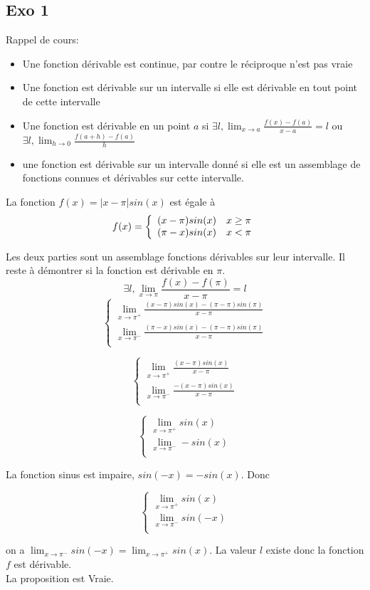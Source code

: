 \documentclass[]{book}
\theoremstyle{definition}
\begin{document}
\subsection*{Exo 1}
Rappel de cours:
\begin{itemize}
\item Une fonction d\'erivable est continue, par contre le r\'eciproque n'est pas vraie
\item Une fonction est d\'erivable sur un intervalle si elle est d\'erivable en tout point de cette intervalle
\item Une fonction est d\'erivable en un point $a$ si $\exists l, \lim_{x \to a}\frac{f(x)-f(a)}{x-a} = l$ ou $\exists l, \lim_{h \to 0}\frac{f(a+h)-f(a)}{h}$
\item une fonction est d\'erivable sur un intervalle donné si elle est un assemblage de fonctions connues et dérivables sur cette intervalle.
\end{itemize}

La fonction $f(x) = |x-\pi| sin(x)$ est \'egale \`a
$$f(x) = 
\left\{ 
\begin{array}{l l}
 (x-\pi) sin(x) & x \ge \pi \\
 (\pi-x) sin(x) & x < \pi \\
\end{array}
\right. 
$$

Les deux parties sont un assemblage fonctions d\'erivables sur leur intervalle. Il reste \`a d\'emontrer si la fonction est d\'erivable en $\pi$.
$$\exists l, \lim_{x \to \pi}\frac{f(x)-f(\pi)}{x-\pi} = l$$
$$ 
\left\{ 
\begin{array}{l}
 \lim_{x \to \pi^{+}}\frac{(x-\pi) sin(x) - (\pi-\pi) sin(\pi)}{x-\pi} \\
 \lim_{x \to \pi^{-}}\frac{(\pi-x) sin(x) - (\pi-\pi) sin(\pi)}{x-\pi} \\
\end{array}
\right. 
$$

$$ 
\left\{ 
\begin{array}{l}
 \lim_{x \to \pi^{+}}\frac{(x-\pi) sin(x)}{x-\pi} \\
 \lim_{x \to \pi^{-}}\frac{-(x-\pi) sin(x)}{x-\pi} \\
\end{array}
\right. 
$$

$$ 
\left\{ 
\begin{array}{l}
 \lim_{x \to \pi^{+}} sin(x) \\
 \lim_{x \to \pi^{-}} -sin(x) \\
\end{array}
\right. 
$$

La fonction sinus est impaire, $sin(-x) = -sin(x)$. Donc

$$ 
\left\{ 
\begin{array}{l}
 \lim_{x \to \pi^{+}} sin(x) \\
 \lim_{x \to \pi^{-}} sin(-x) \\
\end{array}
\right. 
$$

on a $\lim_{x \to \pi^{-}} sin(-x) = \lim_{x \to \pi^{+}} sin(x)$. La valeur $l$ existe donc la fonction $f$ est d\'erivable.\\

La proposition est Vraie.
\end{document}
